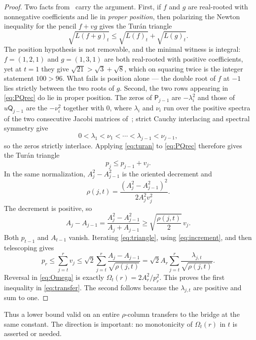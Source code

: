 \documentclass[11pt,a4paper]{article}
\theoremstyle{plain}
\theoremstyle{remark}
\begin{document}
\begin{proof}
Two facts from~\cite{squaretail} carry the argument.  First, if $f$ and $g$
are real-rooted with nonnegative coefficients and lie in \emph{proper
position}, then polarizing the Newton inequality for the pencil $f+vg$ gives
the Tur\'an triangle
\begin{equation}\label{eq:turan}
 \sqrt{L(f+g)_t}\le\sqrt{L(f)_t}+\sqrt{L(g)_t}.
\end{equation}
The position hypothesis is not removable, and the minimal witness is
integral: $f=(1,2,1)$ and $g=(1,3,1)$ are both real-rooted with positive
coefficients, yet at $t=1$ they give $\sqrt{21}>\sqrt3+\sqrt8$, which on
squaring twice is the integer statement $100>96$.  What fails is position
alone --- the double root of $f$ at $-1$ lies strictly between the two roots
of $g$.  Second, the two rows appearing in
\eqref{eq:PQrec} do lie in proper position.  The zeros of $\mathsf P_{j-1}$
are $-\lambda_i^2$ and those of $u\mathsf Q_{j-1}$ are the $-\nu_i^2$
together with $0$, where $\lambda_i$ and $\nu_i$ run over the positive
spectra of the two consecutive Jacobi matrices of~\cite{squaretail}; strict
Cauchy interlacing and spectral symmetry give
\[
 0<\lambda_1<\nu_1<\cdots<\lambda_{j-1}<\nu_{j-1},
\]
so the zeros strictly interlace.  Applying \eqref{eq:turan} to
\eqref{eq:PQrec} therefore gives the Tur\'an triangle
\begin{equation}\label{eq:triangle}
 p_j\le p_{j-1}+v_j.
\end{equation}
In the same normalization, $A_j^2-A_{j-1}^2$ is the oriented decrement and
\[
 \rho(j,t)=\frac{(A_j^2-A_{j-1}^2)^2}{2A_j^2v_j^2}.
\]
The decrement is positive, so
\begin{equation}\label{eq:increment}
 A_j-A_{j-1}
 =\frac{A_j^2-A_{j-1}^2}{A_j+A_{j-1}}
 \ge \sqrt{\frac{\rho(j,t)}2}\,v_j.
\end{equation}
Both $p_{t-1}$ and $A_{t-1}$ vanish.  Iterating \eqref{eq:triangle}, using
\eqref{eq:increment}, and then telescoping gives
\[
 p_r\le\sum_{j=t}^rv_j
 \le\sqrt2\sum_{j=t}^r
 \frac{A_j-A_{j-1}}{\sqrt{\rho(j,t)}}
 =\sqrt2A_r\sum_{j=t}^r
 \frac{\lambda_{j,t}}{\sqrt{\rho(j,t)}}.
\]
Reversal in \eqref{eq:Omega} is exactly
$\Omega_t(r)=2A_r^2/p_r^2$.  This proves the first inequality in
\eqref{eq:transfer}.  The second follows because the $\lambda_{j,t}$ are
positive and sum to one.
\end{proof}

Thus a lower bound valid on an entire $\rho$-column transfers to the bridge
at the same constant.  The direction is important: no monotonicity of
$\Omega_t(r)$ in $t$ is asserted or needed.
\end{document}
